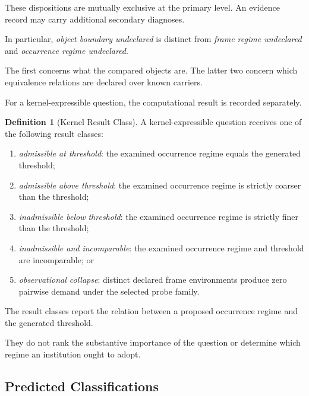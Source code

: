 \documentclass[11pt]{article}
\theoremstyle{plain}
\theoremstyle{definition}
\newtheorem{definition}[theorem]{Definition}
\theoremstyle{remark}
\begin{document}
These dispositions are mutually exclusive
at the primary level.
An evidence record may carry
additional secondary diagnoses.

In particular,
\emph{object boundary undeclared}
is distinct from
\emph{frame regime undeclared}
and
\emph{occurrence regime undeclared}.

The first concerns
what the compared objects are.
The latter two concern
which equivalence relations
are declared over known carriers.

For a kernel-expressible question,
the computational result is recorded separately.

\begin{definition}[Kernel Result Class]
  \label{ik.def.kernel-result-class}
  A kernel-expressible question receives
  one of the following result classes:
  \begin{enumerate}[label=(K\arabic*)]
    \item \emph{admissible at threshold}:
          the examined occurrence regime
          equals the generated threshold;

    \item \emph{admissible above threshold}:
          the examined occurrence regime
          is strictly coarser than the threshold;

    \item \emph{inadmissible below threshold}:
          the examined occurrence regime
          is strictly finer than the threshold;

    \item \emph{inadmissible and incomparable}:
          the examined occurrence regime
          and threshold are incomparable; or

    \item \emph{observational collapse}:
          distinct declared frame environments
          produce zero pairwise demand
          under the selected probe family.
  \end{enumerate}
\end{definition}

The result classes report
the relation between
a proposed occurrence regime
and the generated threshold.

They do not rank the substantive importance
of the question
or determine which regime
an institution ought to adopt.

\subsection{Predicted Classifications}
\end{document}
